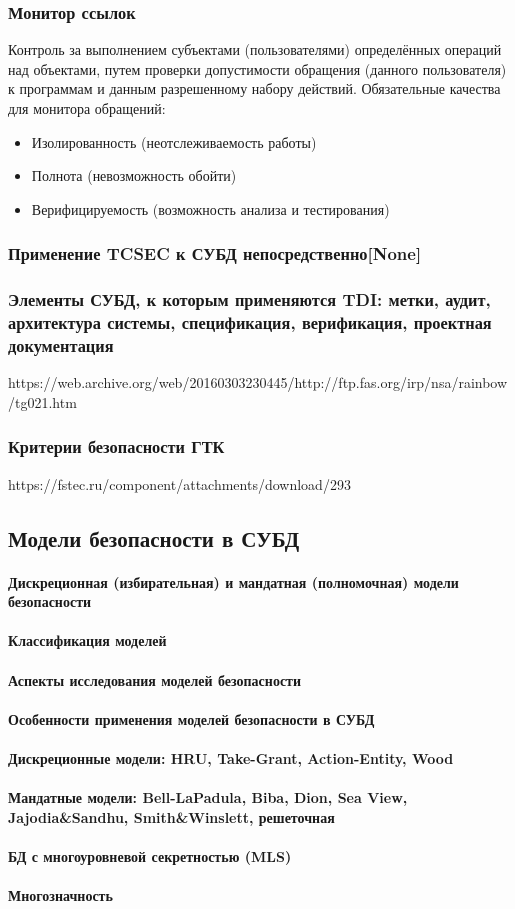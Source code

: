 \subsubsection{Монитор ссылок}
Контроль за выполнением субъектами (пользователями) определённых операций над объектами, путем проверки допустимости обращения (данного пользователя) к программам и данным разрешенному набору действий.
Обязательные качества для монитора обращений:
\begin{itemize}
	\item Изолированность (неотслеживаемость работы)
	\item Полнота (невозможность обойти)
	\item Верифицируемость (возможность анализа и тестирования)
\end{itemize}
\subsubsection{Применение TCSEC к СУБД непосредственно[None]}
\subsubsection{Элементы СУБД, к которым применяются TDI: метки, аудит, архитектура системы, спецификация, верификация, проектная документация}
https://web.archive.org/web/20160303230445/http://ftp.fas.org/irp/nsa/rainbow/tg021.htm
\subsubsection{Критерии безопасности ГТК}
https://fstec.ru/component/attachments/download/293
\subsection{Модели безопасности в СУБД}
\paragraph{Дискреционная (избирательная) и мандатная (полномочная) модели безопасности}
\paragraph{Классификация моделей}
\paragraph{Аспекты исследования моделей безопасности}
\paragraph{Особенности применения моделей безопасности в СУБД}
\paragraph{Дискреционные модели: HRU, Take-Grant, Action-Entity, Wood}
\paragraph{Мандатные модели: Bell-LaPadula, Biba, Dion, Sea View, Jajodia\&Sandhu, Smith\&Winslett, решеточная}
\paragraph{БД с многоуровневой секретностью (MLS)}
\paragraph{Многозначность}